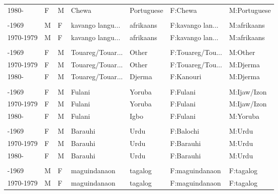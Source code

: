 \begin{ThreePartTable}
\begin{longtable}[t]{lllllll}
\hspace{1em}1980- & F & M & Chewa & Portuguese & F:Chewa & M:Portuguese\\
\addlinespace[0.3em]
\multicolumn{7}{l}{\textbf{Namibia}}\\
\hspace{1em}-1969 & M & F & kavango langu... & afrikaans & F:kavango lan... & M:afrikaans\\
\hspace{1em}1970-1979 & M & F & kavango langu... & afrikaans & F:kavango lan... & M:afrikaans\\
\addlinespace[0.3em]
\multicolumn{7}{l}{\textbf{Niger}}\\
\hspace{1em}-1969 & F & M & Touareg/Touar... & Other & F:Touareg/Tou... & M:Other\\
\hspace{1em}1970-1979 & F & M & Touareg/Touar... & Other & F:Touareg/Tou... & M:Djerma\\
\hspace{1em}1980- & F & M & Touareg/Touar... & Djerma & F:Kanouri & M:Djerma\\
\addlinespace[0.3em]
\multicolumn{7}{l}{\textbf{Nigeria}}\\
\hspace{1em}-1969 & F & M & Fulani & Yoruba & F:Fulani & M:Ijaw/Izon\\
\hspace{1em}1970-1979 & F & M & Fulani & Yoruba & F:Fulani & M:Ijaw/Izon\\
\hspace{1em}1980- & F & M & Fulani & Igbo & F:Fulani & M:Yoruba\\
\addlinespace[0.3em]
\multicolumn{7}{l}{\textbf{Pakistan}}\\
\hspace{1em}-1969 & F & M & Barauhi & Urdu & F:Balochi & M:Urdu\\
\hspace{1em}1970-1979 & F & M & Barauhi & Urdu & F:Barauhi & M:Urdu\\
\hspace{1em}1980- & F & M & Barauhi & Urdu & F:Barauhi & M:Urdu\\
\addlinespace[0.3em]
\multicolumn{7}{l}{\textbf{Philippines}}\\
\hspace{1em}-1969 & M & F & maguindanaon & tagalog & F:maguindanaon & F:tagalog\\
\hspace{1em}1970-1979 & M & F & maguindanaon & tagalog & F:maguindanaon & F:tagalog\\

\end{longtable}
\end{ThreePartTable}
